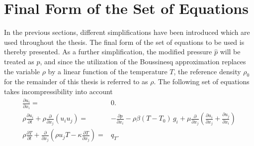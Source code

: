 \section{Final Form of the Set of Equations}

In the previous sections, different simplifications have been introduced which are used throughout the thesis. The final form of the set of equations to be used is thereby presented. As a further simplification, the modified pressure \(\hat{p}\) will be treated as \(p\), and since the utilization of the Boussinesq approximation replaces the variable \(\rho\) by a linear function of the temperature \(T\), the reference density \(\rho_0\) for the remainder of this thesis is referred to as \(\rho\). The following set of equations takes incompressibility into account
\begin{subequations}
\label{eq:completeset}
\begin{align}
\label{eq:contidiff}
\frac{\partial u_i}{\partial x_i} =& 0. \\[1em]
\label{eq:momentumdiff}
\rho \frac{\partial u_i}{\partial t} 
+ \rho \frac{\partial}{\partial x_j} \left( u_i  u_j \right) 
=& - \frac{\partial p}{\partial x_i} 
- \rho \beta \left( T - T_0 \right)\, g_i
+  \mu \frac{\partial}{\partial x_j} \left( \frac{\partial u_i}{\partial x_j} 
+ \frac{\partial u_j}{\partial x_i} \right) \\[1em]
\label{eq:temperaturediff}
\rho \frac{\partial T}{\partial t} + \frac{\partial}{\partial x_j} \left( \rho u_j T - \kappa \frac{\partial T}{\partial x_j} \right) =& q_T.
\end{align}
\end{subequations}

